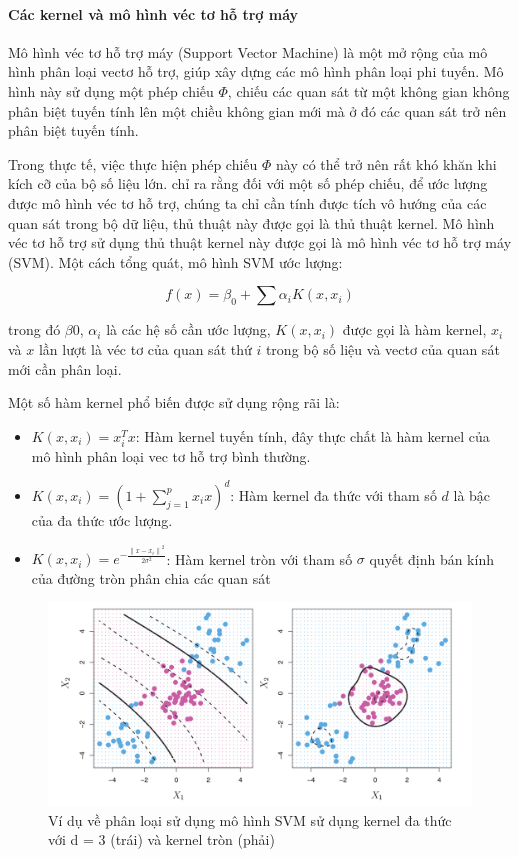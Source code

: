 \documentclass[a4paper]{report}\usepackage[]{graphicx}\usepackage[]{color}
\begin{document}
\paragraph{Các kernel và mô hình véc tơ hỗ trợ máy}

Mô hình véc tơ hỗ trợ máy (Support Vector Machine) là một mở rộng của mô hình phân loại vectơ hỗ trợ, giúp xây dựng các mô hình phân loại phi tuyến. Mô hình này sử dụng một phép chiếu $\Phi$, chiếu các quan sát từ một không gian không phân biệt tuyến tính lên một chiều không gian mới mà ở đó các quan sát trở nên phân biệt tuyến tính.

Trong thực tế, việc thực hiện phép chiếu $\Phi$ này có thể trở nên rất khó khăn khi kích cỡ của bộ số liệu lớn. \textcite{scholkopf1999advances} chỉ ra rằng đối với một số phép chiếu, để ước lượng được mô hình véc tơ hỗ trợ, chúng ta chỉ cần tính được tích vô hướng của các quan sát trong bộ dữ liệu, thủ thuật này được gọi là thủ thuật kernel. Mô hình véc tơ hỗ trợ sử dụng thủ thuật kernel này được gọi là mô hình véc tơ hỗ trợ máy (SVM). Một cách tổng quát, mô hình SVM ước lượng:

$$
f(x) = \beta_0 + \sum\alpha_i K(x, x_i)
$$

trong đó $\beta0$, $\alpha_i$ là các hệ số cần ước lượng, $K(x, x_i)$ được gọi là hàm kernel, $x_i$ và $x$ lần lượt là véc tơ của quan sát thứ $i$ trong bộ số liệu và vectơ của quan sát mới cần phân loại.

Một số hàm kernel phổ biến được sử dụng rộng rãi là:

\begin{itemize}
  \item{$K(x, x_i) = x_i^T x$}: Hàm kernel tuyến tính, đây thực chất là hàm kernel của mô hình phân loại vec tơ hỗ trợ bình thường.
  \item{$K(x, x_i) =  (1 + \sum_{j = 1}^p x_i x)^d$}: Hàm kernel đa thức với tham số $d$ là bậc của đa thức ước lượng.
  \item{$K(x, x_i) = e^{-\frac{{\|x - x_i\|}^2}{2 \sigma^2}}$}: Hàm kernel tròn với tham số $\sigma$ quyết định bán kính của đường tròn phân chia các quan sát
\end{itemize}

\begin{figure}
  \centering
    \includegraphics[width=\textwidth]{./Figures/svm_kernel_example.png}
  \caption[Ví dụ về phân loại sử dụng mô hình SVM]{Ví dụ về phân loại sử dụng mô hình SVM sử dụng kernel đa thức với d = 3 (trái) và kernel tròn (phải)}
  \label{fig:svm_kernel_example}
\end{figure}
\end{document}
